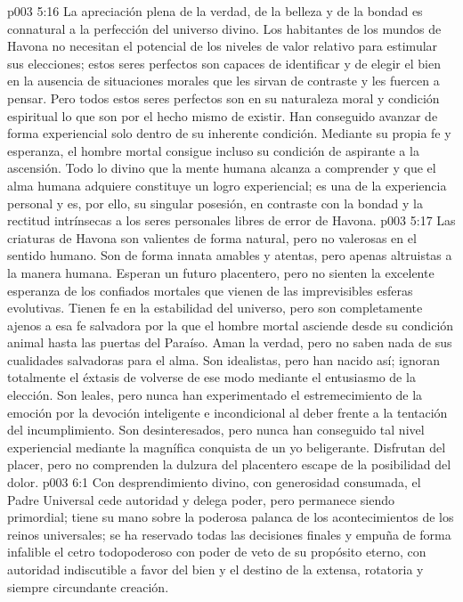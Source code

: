 \vs p003 5:16 \pc La apreciación plena de la verdad, de la belleza y de la bondad es connatural a la perfección del universo divino. Los habitantes de los mundos de Havona no necesitan el potencial de los niveles de valor relativo para estimular sus elecciones; estos seres perfectos son capaces de identificar y de elegir el bien en la ausencia de situaciones morales que les sirvan de contraste y les fuercen a pensar. Pero todos estos seres perfectos son en su naturaleza moral y condición espiritual lo que son por el hecho mismo de existir. Han conseguido avanzar de forma experiencial solo dentro de su inherente condición. Mediante su propia fe y esperanza, el hombre mortal consigue incluso su condición de aspirante a la ascensión. Todo lo divino que la mente humana alcanza a comprender y que el alma humana adquiere constituye un logro experiencial; es una  de la experiencia personal y es, por ello, su singular posesión, en contraste con la bondad y la rectitud intrínsecas a los seres personales libres de error de Havona.
\vs p003 5:17 \pc Las criaturas de Havona son valientes de forma natural, pero no valerosas en el sentido humano. Son de forma innata amables y atentas, pero apenas altruistas a la manera humana. Esperan un futuro placentero, pero no sienten la excelente esperanza de los confiados mortales que vienen de las imprevisibles esferas evolutivas. Tienen fe en la estabilidad del universo, pero son completamente ajenos a esa fe salvadora por la que el hombre mortal asciende desde su condición animal hasta las puertas del Paraíso. Aman la verdad, pero no saben nada de sus cualidades salvadoras para el alma. Son idealistas, pero han nacido así; ignoran totalmente el éxtasis de volverse de ese modo mediante el entusiasmo de la elección. Son leales, pero nunca han experimentado el estremecimiento de la emoción por la devoción inteligente e incondicional al deber frente a la tentación del incumplimiento. Son desinteresados, pero nunca han conseguido tal nivel experiencial mediante la magnífica conquista de un yo beligerante. Disfrutan del placer, pero no comprenden la dulzura del placentero escape de la posibilidad del dolor.
\vs p003 6:1 Con desprendimiento divino, con generosidad consumada, el Padre Universal cede autoridad y delega poder, pero permanece siendo primordial; tiene su mano sobre la poderosa palanca de los acontecimientos de los reinos universales; se ha reservado todas las decisiones finales y empuña de forma infalible el cetro todopoderoso con poder de veto de su propósito eterno, con autoridad indiscutible a favor del bien y el destino de la extensa, rotatoria y siempre circundante creación.

